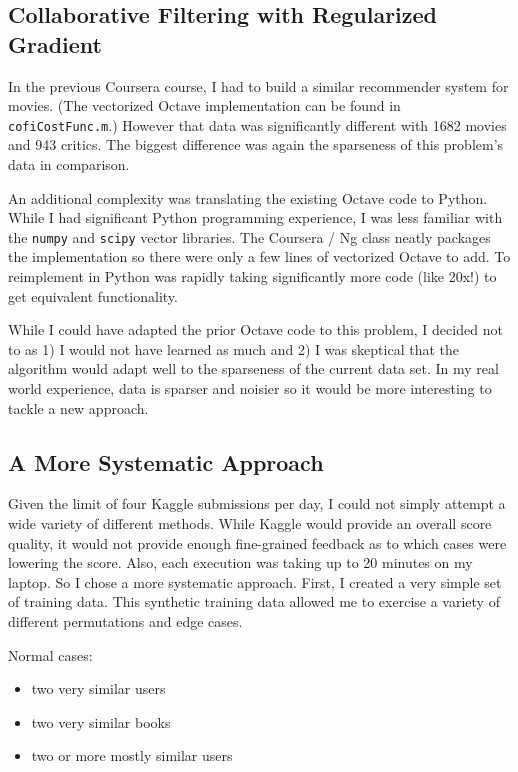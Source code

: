 \documentclass[11pt, oneside]{article}   	%
\begin{document}
\subsection*{Collaborative Filtering with Regularized Gradient}

\par In the previous Coursera course, I had to build a similar recommender system for movies. (The vectorized Octave implementation can be found in \texttt{cofiCostFunc.m}.) However that data was significantly different with 1682 movies and 943 critics. The biggest difference was again the sparseness of this problem's data in comparison.

An additional complexity was translating the existing Octave code to Python. While I had significant Python programming experience, I was less familiar with the \texttt{numpy} and \texttt{scipy} vector libraries. The Coursera / Ng class neatly packages the implementation so there were only a few lines of vectorized Octave to add. To reimplement in Python was rapidly taking significantly more code (like 20x!) to get equivalent functionality. 

While I could have adapted the prior Octave code to this problem, I decided not to as 1) I would not have learned as much and 2) I was skeptical that the algorithm would adapt well to the sparseness of the current data set. In my real world experience, data is sparser and noisier so it would be more interesting to tackle a new approach.

\subsection*{A More Systematic Approach}

Given the limit of four Kaggle submissions per day, I could not simply attempt a wide variety of different methods. While Kaggle would provide an overall score quality, it would not provide enough fine-grained feedback as to which cases were lowering the score. Also, each execution was taking up to 20 minutes on my laptop. So I chose a more systematic approach. First, I created a very simple set of training data. This synthetic training data allowed me to exercise a variety of different permutations and edge cases.

Normal cases:
\begin{itemize}
  \item two very similar users
  \item two very similar books
  \item two or more mostly similar users
\end{itemize}
\end{document}
